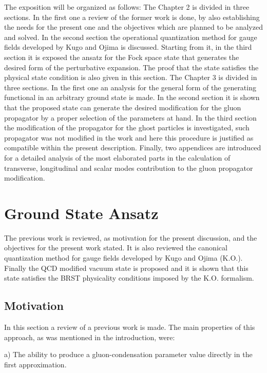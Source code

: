 \documentclass[12pt,letterpaper]{report}
\begin{document}
The exposition will be organized as follows: The Chapter 2 is
divided in three sections. In the first one a review of the former
work \cite{Cabo} is done, by also establishing the needs for the
present one and the objectives which are planned to be analyzed
and solved. In the second section the operational quantization
method for gauge fields developed by Kugo and Ojima is discussed.
Starting from it, in the third section it is exposed the ansatz
for the Fock space state that generates the desired form of the
perturbative expansion. The proof that the state satisfies the
physical state condition is also given in this section. The
Chapter 3 is divided in three sections. In the first one an
analysis for the general form of the generating functional in an
arbitrary ground state is made. In the second section it is shown
that the proposed state can generate the desired modification for
the gluon propagator by a proper selection of the parameters at
hand. In the third section the modification of the propagator for
the ghost particles is investigated, such propagator was not
modified in the work \cite{Cabo} and here this procedure is
justified as compatible within the present description. Finally,
two appendices are introduced for a detailed analysis of the most
elaborated parts in the calculation of transverse, longitudinal
and scalar modes contribution to the gluon propagator
modification.

\chapter{Ground State Ansatz}

The previous work \cite{Cabo} is reviewed, as motivation for the
present discussion, and the objectives for the present work
stated. It is also reviewed the canonical quantization method for
gauge fields developed by Kugo and Ojima (K.O.). Finally the QCD
modified vacuum state is proposed and it is shown that this state
satisfies the BRST physicality conditions imposed by the K.O.
formalism.

\section{Motivation}

In this section a review of a previous work \cite{Cabo} is made.
The main properties of this approach, as was mentioned in the
introduction, were:

a) The ability to produce a gluon-condensation parameter value
\coordHE{} directly in the first
approximation.
\end{document}

